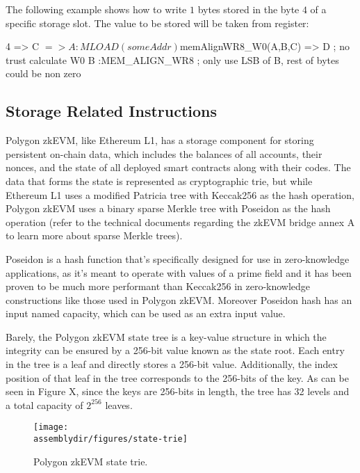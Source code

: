 The following example shows how to write $1$ bytes stored in the byte $4$ of a specific storage slot. The value to be stored will be taken from \B register:

\begin{zkasm}
4 => C
$ => A          :MLOAD(someAddr)
${memAlignWR8_W0(A,B,C)} => D  ; no trust calculate W0
B               :MEM_ALIGN_WR8 ; only use LSB of B, rest of bytes could be non zero
\end{zkasm}

\subsection{Storage Related Instructions}

Polygon zkEVM, like Ethereum L1, has a storage component for storing persistent on-chain data, which includes the balances of all accounts, their nonces, and the state of all deployed smart contracts along with their codes. The data that forms the state is represented as cryptographic trie, but while Ethereum L1 uses a modified Patricia tree with Keccak256 as the hash operation, Polygon zkEVM uses a binary sparse Merkle tree with Poseidon as the hash operation (refer to the technical documents regarding the zkEVM bridge annex A to learn more about sparse Merkle trees).

Poseidon is a hash function that's specifically designed for use in zero-knowledge applications, as it's meant to operate with values of a prime field and it has been proven to be much more performant than Keccak256 in zero-knowledge constructions like those used in Polygon zkEVM. Moreover Poseidon hash has an input named capacity, which can be used as an extra input value.

Barely, the Polygon zkEVM state tree is a key-value structure in which the integrity can be ensured by a 256-bit value known as the state root. Each entry in the tree is a leaf and directly stores a 256-bit value. Additionally, the index position of that leaf in the tree corresponds to the 256-bits of the key. As can be seen in Figure X, since the keys are 256-bits in length, the tree has 32 levels and a total capacity of $2^{256}$ leaves.


\begin{figure}[H]
    \centering
    \texttt{[image: \\assemblydir/figures/state-trie]}
    \caption{Polygon zkEVM state trie.}
    \label{fig:hashk-add-bytes}
\end{figure}

